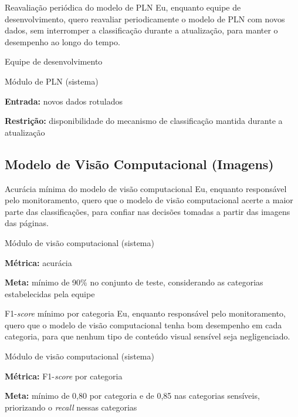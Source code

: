 \documentclass[
    12pt,           %
    oneside,        %
    a4paper,        %
    chapter=TITLE,  %
    english,        %
    brazil          %
]{abntex2}
\begin{document}
{Reavaliação periódica do modelo de PLN}
{Eu, enquanto equipe de desenvolvimento, quero reavaliar periodicamente o modelo de PLN com novos dados, sem interromper a classificação durante a atualização, para manter o desempenho ao longo do tempo.}
{\begin{dadoslista}
\item Equipe de desenvolvimento
\item Módulo de PLN (sistema)
\end{dadoslista}}
{\begin{dadoslista}
\item \textbf{Entrada:} novos dados rotulados
\item \textbf{Restrição:} disponibilidade do mecanismo de classificação mantida durante a atualização
\end{dadoslista}}

\subsection{Modelo de Visão Computacional (Imagens)}

{Acurácia mínima do modelo de visão computacional}
{Eu, enquanto responsável pelo monitoramento, quero que o modelo de visão computacional acerte a maior parte das classificações, para confiar nas decisões tomadas a partir das imagens das páginas.}
{\begin{dadoslista}
\item Módulo de visão computacional (sistema)
\end{dadoslista}}
{\begin{dadoslista}
\item \textbf{Métrica:} acurácia
\item \textbf{Meta:} mínimo de 90\% no conjunto de teste, considerando as categorias estabelecidas pela equipe
\end{dadoslista}}

{F1-\textit{score} mínimo por categoria}
{Eu, enquanto responsável pelo monitoramento, quero que o modelo de visão computacional tenha bom desempenho em cada categoria, para que nenhum tipo de conteúdo visual sensível seja negligenciado.}
{\begin{dadoslista}
\item Módulo de visão computacional (sistema)
\end{dadoslista}}
{\begin{dadoslista}
\item \textbf{Métrica:} F1-\textit{score} por categoria
\item \textbf{Meta:} mínimo de 0,80 por categoria e de 0,85 nas categorias sensíveis, priorizando o \textit{recall} nessas categorias
\end{dadoslista}}
\end{document}
